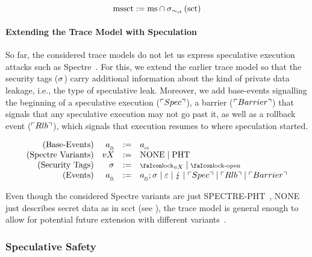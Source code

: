 \documentclass[a4paper,12pt]{article}
\begin{document}
\begin{definition}{}
  \[
  \text{mssct}:=\text{ms}\cap\sigma_{\sim_{\text{ct}}}\left(\text{sct}\right)
  \]
\end{definition}

\paragraph{Extending the Trace Model with Speculation}

So far, the considered trace models do not let us express speculative execution attacks such as Spectre~\cite{kocher2019spectre}. 
For this, we extend the earlier trace model so that the security tags ($\sigma_{}{}$) carry additional information about the kind of private data leakage, i.e., the type of speculative leak.
Moreover, we add base-events signalling the beginning of a speculative execution ($\ulcorner Spec \urcorner$), a barrier ($\ulcorner Barrier \urcorner$) that signals that any speculative execution may not go past it, as well as a rollback event ($\ulcorner Rlb \urcorner$), which signals that execution resumes to where speculation started.

\vspace{-1em}
{
\[
  \begin{array}{rrcl}
    (\text{Base-Events}) & \varEvent[_{\mathghost}] &:=& \varEvent[_{\ctsafe}] \\
    (\text{Spectre Variants}) & vX &:=& \operatorname{NONE} \mid \operatorname{PHT} \\
    (\text{Security Tags}) & \varSecuritytag{} &:=& \lock_{vX} \mid \unlock\\ 
    (\text{Events}) & \varEvent[_{\mathghost}] &:=& \varEvent[_{\mathghost}];\varSecuritytag{} \mid \emptyevent \mid \lightning \mid \ev{Spec} \mid \ev{Rlb} \mid \ev{Barrier}\\ 
  \end{array}
\]
}

Even though the considered Spectre variants are just SPECTRE-PHT~\cite{kocher2019spectre}, NONE just describes secret data as in \gls*{scct} (see ), the trace model is general enough to allow for potential future extension with different variants~\cite{kocher2019spectre,maisuradze2018ret2spec,horn2019zero}.

\subsubsection{Speculative Safety}
\end{document}

